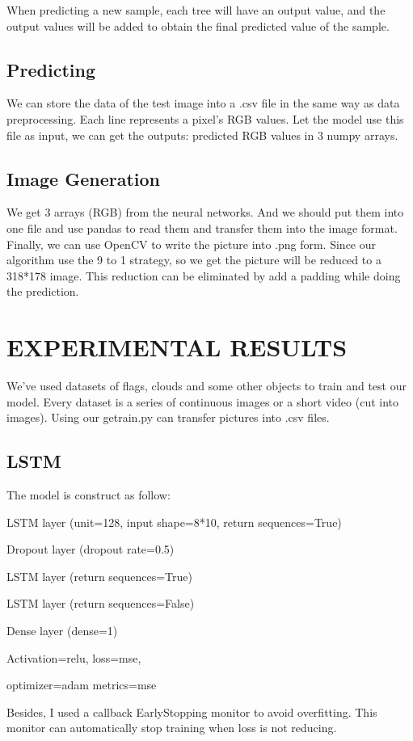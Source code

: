 \documentclass{acmtog} %
\begin{document}
When predicting a new sample, each tree will have an output value, and the output values will be added to obtain the final predicted value of the sample. 

\subsection{Predicting}
We can store the data of the test image into a .csv file in the same way as data preprocessing. Each line represents a pixel’s RGB values. Let the model use this file as input, we can get the outputs:  predicted RGB values in 3 numpy arrays.

\subsection{Image Generation}
We get 3 arrays (RGB) from the neural networks. And we should put them into one file and use pandas to read them and transfer them into the image format. Finally, we can use OpenCV to write the picture into .png form. Since our algorithm use the 9 to 1 strategy, so we get the picture will be reduced to a 318*178 image. This reduction can be eliminated by add a padding while doing the prediction. 

\section{EXPERIMENTAL RESULTS}
We’ve used datasets of flags, clouds and some other objects to train and test our model. Every dataset is a series of continuous images or a short video (cut into images). Using our getrain.py can transfer pictures into .csv files.
\subsection{LSTM}
The model is construct as follow:

LSTM layer (unit=128, input shape=8*10, return sequences=True)

Dropout layer (dropout rate=0.5)

LSTM layer (return sequences=True)

LSTM layer (return sequences=False)

Dense layer (dense=1)

Activation=relu, loss=mse, 

optimizer=adam metrics=mse

Besides, I used a callback EarlyStopping monitor to avoid overfitting. This monitor can automatically stop training when loss is not reducing.
\end{document}
